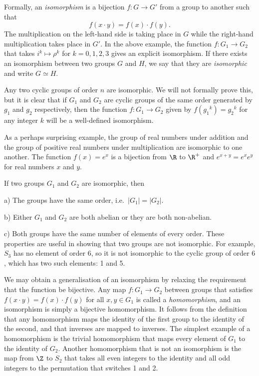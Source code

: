 Formally, an {\it isomorphism} is a bijection $f:G\rightarrow G'$ from a group to another such that
$$f(x\cdot y) = f(x) \cdot f(y).$$
The multiplication on the left-hand side is taking place in $G$ while the right-hand multiplication takes place in $G'$. In the above example, the function $f : G_1 \rightarrow G_2$ that takes $i^k \mapsto \rho^k$ for $k=0,1,2,3$ gives an explicit isomorphism. If there exists an isomorphism between two groups $G$ and $H$, we say that they are {\it isomorphic} and write $G\simeq H$.

Any two cyclic groups of order $n$ are isomorphic. We will not formally prove this, but it is clear that if $G_1$ and $G_2$ are cyclic groups of the same order generated by $g_1$ and $g_2$ respectively, then the function $f : G_1 \rightarrow G_2$ given by $f({g_1}^k) = {g_2}^k$ for any integer $k$ will be a well-defined isomorphism.

As a perhaps surprising example, the group of real numbers under addition and the group of positive real numbers under multiplication are isomorphic to one another. The function $f(x) = e^x$ is a bijection from $\R$ to $\R^+$ and $e^{x+y} = e^xe^y$ for real numbers $x$ and $y$.

If two groups $G_1$ and $G_2$ are isomorphic, then
\medskip
\item {a)} The groups have the same order, i.e.\ $|G_1| = |G_2|$.
\smallskip
\item {b)} Either $G_1$ and $G_2$ are both abelian or they are both non-abelian.
\smallskip
\item {c)} Both groups have the same number of elements of every order.
\medskip
These properties are useful in showing that two groups are not isomorphic. For example, $S_3$ has no element of order $6$, so it is not isomorphic to the cyclic group of order $6$, which has two such elements: 1 and 5.

We may obtain a generalisation of an isomorphism by relaxing the requirement that the function be bijective. Any map $f : G_1 \rightarrow G_2$ between groups that satisfies $f(x\cdot y) = f(x)\cdot f(y)$ for all $x,y\in G_1$ is called a {\it homomorphism}, and an isomorphism is simply a bijective homomorphism. It follows from the definition that any homomorphism maps the identity of the first group to the identity of the second, and that inverses are mapped to inverses. The simplest example of a homomorphism is the trivial homomorphism that maps every element of $G_1$ to the identity of $G_2$. Another homomorphism that is not an isomorphism is the map from $\Z$ to $S_2$ that takes all even integers to the identity and all odd integers to the permutation that switches 1 and 2.


